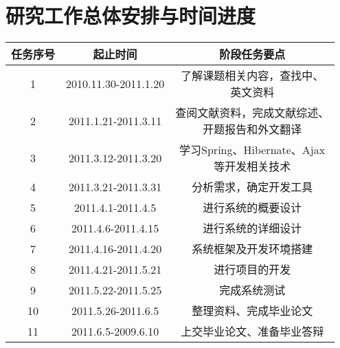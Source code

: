 
\chapter{研究工作总体安排与时间进度}
\begin{table}[!h]
\vspace{0.5em}\centering\xiaosi
\begin{tabular}{|c|c|c|}
\toprule[1.5pt]
任务序号 & 起止时间 & 阶段任务要点 \\
\midrule[1pt]
1 & 2010.11.30-2011.1.20 & \tabincell{c}{了解课题相关内容，查找中、\\英文资料} \\\hline
2 & 2011.1.21-2011.3.11 & \tabincell{c}{查阅文献资料，完成文献综述、\\开题报告和外文翻译} \\\hline
3 & 2011.3.12-2011.3.20 & \tabincell{c}{学习Spring、Hibernate、Ajax\\等开发相关技术} \\\hline
4 & 2011.3.21-2011.3.31 & 分析需求，确定开发工具 \\\hline
5 & 2011.4.1-2011.4.5 & 进行系统的概要设计 \\\hline
6 & 2011.4.6-2011.4.15 & 进行系统的详细设计 \\\hline
7 & 2011.4.16-2011.4.20 & 系统框架及开发环境搭建 \\\hline
8 & 2011.4.21-2011.5.21 & 进行项目的开发 \\\hline
9 & 2011.5.22-2011.5.25 & 完成系统测试 \\\hline
10 & 2011.5.26-2011.6.5 & 整理资料、完成毕业论文 \\\hline
11 & 2011.6.5-2009.6.10 & 上交毕业论文、准备毕业答辩 \\
\bottomrule[1.5pt]
\end{tabular}
\end{table}
